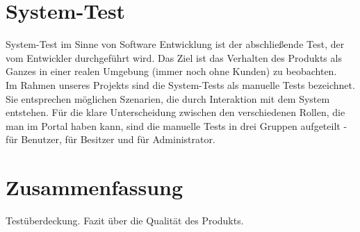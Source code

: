 \documentclass[parskip=full,11pt]{scrartcl}
\begin{document}
\newpage
\section{System-Test}
System-Test im Sinne von Software Entwicklung ist der abschließende Test, der vom Entwickler durchgeführt wird. Das Ziel ist das Verhalten des Produkts als Ganzes in einer realen Umgebung (immer noch ohne Kunden) zu beobachten.\\
Im Rahmen unseres Projekts sind die System-Tests als manuelle Tests bezeichnet. Sie entsprechen möglichen Szenarien, die durch Interaktion mit dem System entstehen. Für die klare Unterscheidung zwischen den verschiedenen Rollen, die man im Portal haben kann, sind die manuelle Tests in drei Gruppen aufgeteilt - für Benutzer, für Besitzer und für Administrator.

\newpage
\section{Zusammenfassung}
Testüberdeckung. Fazit über die Qualität des Produkts.
\end{document}
